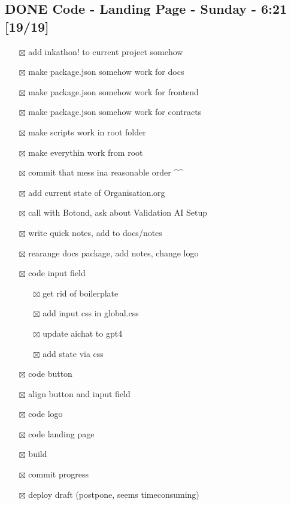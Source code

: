 \documentclass[11pt]{article}
\begin{document}
\subsection{{\bfseries\sffamily DONE} Code - Landing Page - Sunday - 6:21 [19/19]}
\label{sec:org0676221}
\begin{itemize}
\item[{$\boxtimes$}] add inkathon! to current project somehow
\item[{$\boxtimes$}] make package.json somehow work for docs
\item[{$\boxtimes$}] make package.json somehow work for frontend
\item[{$\boxtimes$}] make package.json somehow work for contracts
\item[{$\boxtimes$}] make scripts work in root folder
\item[{$\boxtimes$}] make everythin work from root
\item[{$\boxtimes$}] commit that mess ina reasonable order \^{}\^{}
\item[{$\boxtimes$}] add current state of Organisation.org
\item[{$\boxtimes$}] call with Botond, ask about Validation AI Setup
\item[{$\boxtimes$}] write quick notes, add to docs/notes
\item[{$\boxtimes$}] rearange docs package, add notes, change logo
\item[{$\boxtimes$}] code input field
\begin{itemize}
\item[{$\boxtimes$}] get rid of boilerplate
\item[{$\boxtimes$}] add input css in global.css
\item[{$\boxtimes$}] update aichat to gpt4
\item[{$\boxtimes$}] add state via css
\end{itemize}
\item[{$\boxtimes$}] code button
\item[{$\boxtimes$}] align button and input field
\item[{$\boxtimes$}] code logo
\item[{$\boxtimes$}] code landing page
\item[{$\boxtimes$}] build
\item[{$\boxtimes$}] commit progress
\item[{$\boxtimes$}] deploy draft (postpone, seems timeconsuming)
\end{itemize}
\end{document}
